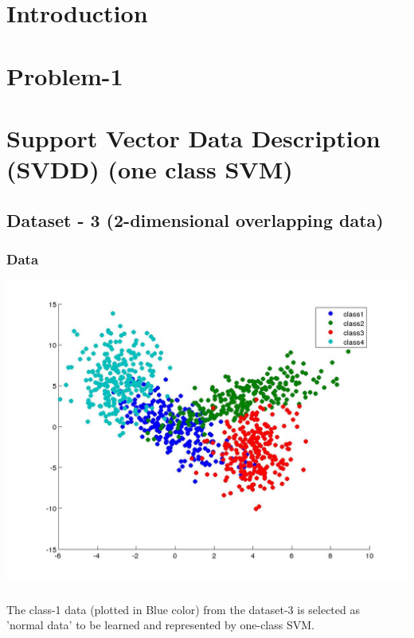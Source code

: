 \documentclass[fleqn]{article}
\title{}
\author{Arulkumar S (CS15S023), Divya Saglani (CS15M041), Nitish (CS15S028)}
\date{$12^{th}$ May 2016}
\begin{document}
\setcounter{secnumdepth}{5}
\tracingall
\section{Introduction}
\section{Problem-1}
\newpage
\section{Support Vector Data Description (SVDD) (one class SVM)}

\subsection{Dataset - 3 (2-dimensional overlapping data)}

\subsubsection{Data}
\includegraphics[scale=0.3]{./pics/dataset3_snap.jpg}\\\\
The class-1 data (plotted in Blue color) from the dataset-3 is selected as \\
'normal data' to be learned and represented by one-class SVM. 
\end{document}
